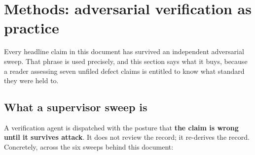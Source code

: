 \documentclass[11pt,a4paper]{article}
\begin{document}
\section{Methods: adversarial verification as practice}
\label{sec:methods}

Every headline claim in this document has survived an independent adversarial sweep. That
phrase is used precisely, and this section says what it buys, because a reader assessing
seven unfiled defect claims is entitled to know what standard they were held to.

\subsection{What a supervisor sweep is}

A verification agent is dispatched with the posture that \textbf{the claim is wrong until it
survives attack}. It does not review the record; it re-derives the record. Concretely, across
the six sweeps behind this document:
\end{document}

